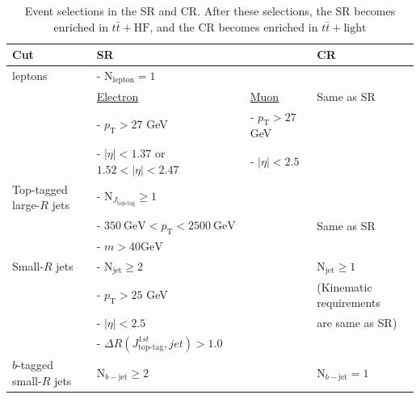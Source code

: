 \begin{table}[H]
  \centering
  \begin{tabular*}{160mm}{l|ll|l}
    \hline\hline
    Cut                       & SR                                                          &                           & CR\\
    \hline
    leptons                   &  - $\text{N}_{\text{lepton}}=1$                             &                           & \\
                              & \underline{Electron}                                        & \underline{Muon}          & Same as SR\\
                              &  - $p_{\text{T}}>27$ GeV                                    &  - $p_{\text{T}}>27$ GeV  & \\
                              &  - $|\eta|<1.37$ or $1.52<|\eta|<2.47$                      &  - $|\eta|<2.5$           & \\
    \hline
    Top-tagged large-$R$ jets &  - $\text{N}_{J_{\text{top-tag}}} \geq 1$                   &                           &\\
                              &  - $350~\text{GeV}<p_{\text{T}}<2500~\text{GeV}$            &                           & Same as SR\\
                              &  - $m>40\text{GeV}$                                         &                           & \\
    \hline
    Small-$R$ jets            &  - $\text{N}_{\text{jet}} \geq 2$                           &                           & $\text{N}_{\text{jet}} \geq 1$ \\
                              &  - $p_{\text{T}}>25$ GeV                                    &                           & (Kinematic requirements\\
                              &  - $|\eta|<2.5$                                             &                           &  are same as SR)\\
                              &  - ${\Delta}R(J_{\text{top-tag}}^{1st}, jet)>1.0$           &                           & \\
    \hline
    $b$-tagged small-$R$ jets & $\text{N}_{b-\text{jet}} \geq 2$                            &                        & $\text{N}_{b-\text{jet}}=1$\\

    \hline\hline
  \end{tabular*}
  \caption{Event selections in the SR and CR. After these selections, the SR becomes enriched in $t\bar{t}+\text{HF}$, and the CR becomes enriched in $t\bar{t}+\text{light}$}
  \label{tab:EventSelectionInSR1AndSR2}
\end{table}

